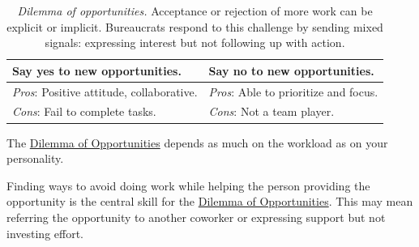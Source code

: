\begin{center}
\begin{table}[H] %
\begin{tabular}{ | m{\dilemmatablewidth}| m{\dilemmatablewidth} | } 
  \hline
  \textbf{Say yes to new opportunities.} & 
  \textbf{Say no to new opportunities.} \\ 
  \hline
  \textit{Pros}: Positive attitude, collaborative. &
  \textit{Pros}: Able to prioritize and focus. \\
  \hline
  \textit{Cons}: Fail to complete tasks. &
  \textit{Cons}: Not a team player. \\  
  \hline
\end{tabular}
\caption{
\textit{Dilemma of opportunities.}
Acceptance or rejection of more work can be explicit or implicit. Bureaucrats respond to this challenge by sending mixed signals: expressing interest but not following up with action.
}
\label{table:dilemma-new-opportunties-yes-no}
\end{table}
\end{center}

The \hyperref[table:dilemma-new-opportunties-yes-no]{Dilemma of Opportunities} 
\iftoggle{printedonpaper}{ (\ref{table:dilemma-new-opportunties-yes-no})}{}%
depends as much on the workload as on your personality. 

Finding ways to avoid doing work while helping the person providing the opportunity is the central skill for the \hyperref[table:dilemma-new-opportunties-yes-no]{Dilemma of Opportunities}. This may mean referring the opportunity to another coworker or expressing support but not investing effort. 



